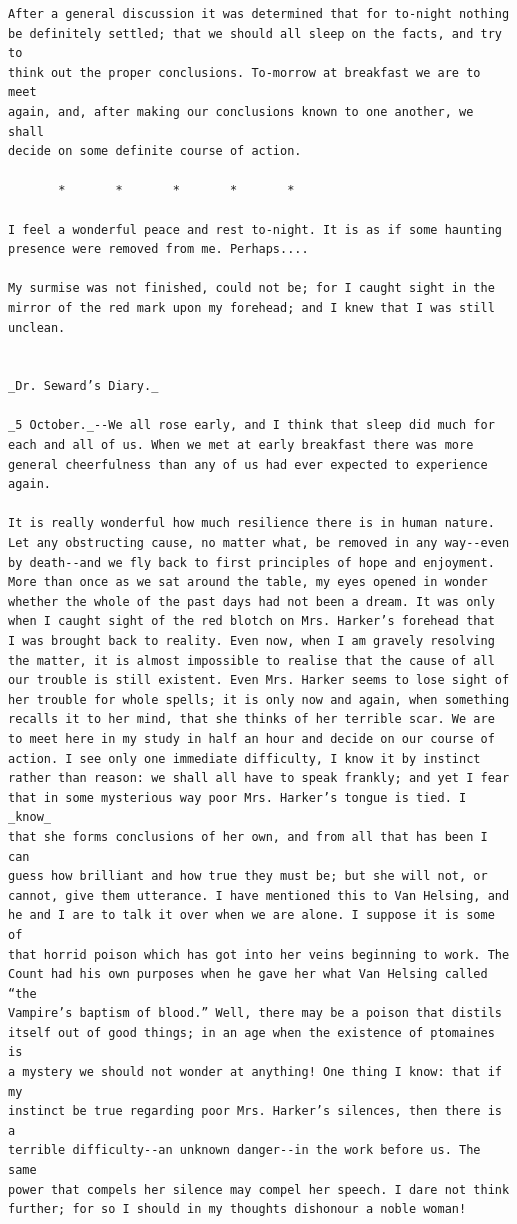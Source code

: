 \documentclass{article}
\begin{document}
\begin{verbatim}
After a general discussion it was determined that for to-night nothing
be definitely settled; that we should all sleep on the facts, and try to
think out the proper conclusions. To-morrow at breakfast we are to meet
again, and, after making our conclusions known to one another, we shall
decide on some definite course of action.

       *       *       *       *       *

I feel a wonderful peace and rest to-night. It is as if some haunting
presence were removed from me. Perhaps....

My surmise was not finished, could not be; for I caught sight in the
mirror of the red mark upon my forehead; and I knew that I was still
unclean.


_Dr. Seward’s Diary._

_5 October._--We all rose early, and I think that sleep did much for
each and all of us. When we met at early breakfast there was more
general cheerfulness than any of us had ever expected to experience
again.

It is really wonderful how much resilience there is in human nature.
Let any obstructing cause, no matter what, be removed in any way--even
by death--and we fly back to first principles of hope and enjoyment.
More than once as we sat around the table, my eyes opened in wonder
whether the whole of the past days had not been a dream. It was only
when I caught sight of the red blotch on Mrs. Harker’s forehead that
I was brought back to reality. Even now, when I am gravely resolving
the matter, it is almost impossible to realise that the cause of all
our trouble is still existent. Even Mrs. Harker seems to lose sight of
her trouble for whole spells; it is only now and again, when something
recalls it to her mind, that she thinks of her terrible scar. We are
to meet here in my study in half an hour and decide on our course of
action. I see only one immediate difficulty, I know it by instinct
rather than reason: we shall all have to speak frankly; and yet I fear
that in some mysterious way poor Mrs. Harker’s tongue is tied. I _know_
that she forms conclusions of her own, and from all that has been I can
guess how brilliant and how true they must be; but she will not, or
cannot, give them utterance. I have mentioned this to Van Helsing, and
he and I are to talk it over when we are alone. I suppose it is some of
that horrid poison which has got into her veins beginning to work. The
Count had his own purposes when he gave her what Van Helsing called “the
Vampire’s baptism of blood.” Well, there may be a poison that distils
itself out of good things; in an age when the existence of ptomaines is
a mystery we should not wonder at anything! One thing I know: that if my
instinct be true regarding poor Mrs. Harker’s silences, then there is a
terrible difficulty--an unknown danger--in the work before us. The same
power that compels her silence may compel her speech. I dare not think
further; for so I should in my thoughts dishonour a noble woman!


\end{verbatim}
\end{document}
